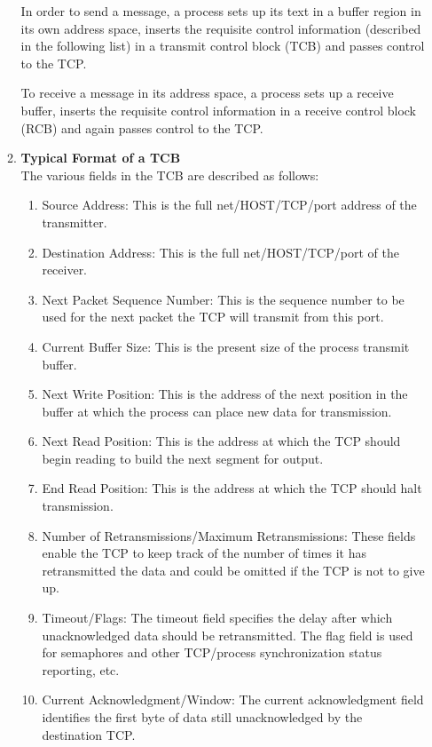 \documentclass[12pt]{article}
\begin{document}
\begin{enumerate}
\begin{enumerate}[label=(\alph*)]
In order to send a message, a process sets up its text in a buffer region in its own address space, inserts the requisite control information (described
in the following list) in a transmit control block (TCB) and passes control to the TCP.

To receive a message in its address space, a process sets up a receive buffer, inserts the requisite control information in a receive
control block (RCB) and again passes control to the TCP.

\item \textbf{Typical Format of a TCB} \\
The various fields in the TCB are described as follows:
\begin{enumerate}
    \item Source Address: This is the full net/HOST/TCP/port address of the transmitter.
    \item Destination Address: This is the full net/HOST/TCP/port of the receiver.
    \item Next Packet Sequence Number: This is the sequence number to be used for the next packet the TCP will transmit from this port.
    \item Current Buffer Size: This is the present size of the process transmit buffer.
    \item Next Write Position: This is the address of the next position in the buffer at which the process can place new data for transmission.
    \item Next Read Position: This is the address at which the TCP should begin reading to build the next segment for output.
    \item End Read Position: This is the address at which the TCP should halt transmission.
    \item Number of Retransmissions/Maximum Retransmissions: These fields enable the TCP to keep track of the number of times it has retransmitted the data and could be omitted if the TCP is not to give up.
    \item Timeout/Flags: The timeout field specifies the delay after which unacknowledged data should be retransmitted. The flag field is used for semaphores and other TCP/process synchronization status reporting, etc.
    \item Current Acknowledgment/Window: The current acknowledgment field identifies the first byte of data still unacknowledged by the destination TCP.
\end{enumerate}
\end{enumerate} %


\end{enumerate}
\end{document}
